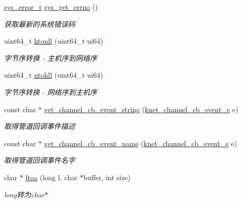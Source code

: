 \begin{DoxyCompactItemize}
\hyperlink{a00066_aeaea39e7ef5adeec1efaee3eee6b12ff_aeaea39e7ef5adeec1efaee3eee6b12ff}{sys\+\_\+error\+\_\+t} \hyperlink{a00099_a2e3ede072c59452900afcb1334611dac_a2e3ede072c59452900afcb1334611dac}{sys\+\_\+get\+\_\+errno} ()
\begin{DoxyCompactList}\small\item\em 获取最新的系统错误码 \end{DoxyCompactList}\item 
uint64\+\_\+t \hyperlink{a00099_ab1f59aa518d342661072356abbbb5e85_ab1f59aa518d342661072356abbbb5e85}{htonll} (uint64\+\_\+t ui64)
\begin{DoxyCompactList}\small\item\em 字节序转换 -\/ 主机序到网络序 \end{DoxyCompactList}\item 
uint64\+\_\+t \hyperlink{a00099_aebdeac120dd80e9450e54e6f18151f45_aebdeac120dd80e9450e54e6f18151f45}{ntohll} (uint64\+\_\+t ui64)
\begin{DoxyCompactList}\small\item\em 字节序转换 -\/ 网络序到主机序 \end{DoxyCompactList}\item 
const char $\ast$ \hyperlink{a00099_aaa5f51532b5e8589a2af4a949dfcb46b_aaa5f51532b5e8589a2af4a949dfcb46b}{get\+\_\+channel\+\_\+cb\+\_\+event\+\_\+string} (\hyperlink{a00066_a2fd2faf971268f5b682ab375c455f7c9_a2fd2faf971268f5b682ab375c455f7c9}{knet\+\_\+channel\+\_\+cb\+\_\+event\+\_\+e} e)
\begin{DoxyCompactList}\small\item\em 取得管道回调事件描述 \end{DoxyCompactList}\item 
const char $\ast$ \hyperlink{a00099_a3c666a6bdd27f2bdb2202ffd4fb8899e_a3c666a6bdd27f2bdb2202ffd4fb8899e}{get\+\_\+channel\+\_\+cb\+\_\+event\+\_\+name} (\hyperlink{a00066_a2fd2faf971268f5b682ab375c455f7c9_a2fd2faf971268f5b682ab375c455f7c9}{knet\+\_\+channel\+\_\+cb\+\_\+event\+\_\+e} e)
\begin{DoxyCompactList}\small\item\em 取得管道回调事件名字 \end{DoxyCompactList}\item 
char $\ast$ \hyperlink{a00099_aaf5ac9c0270bd67e64f697d7fcf5e9ea_aaf5ac9c0270bd67e64f697d7fcf5e9ea}{ltoa} (long l, char $\ast$buffer, int size)
\begin{DoxyCompactList}\small\item\em long转为char$\ast$ \end{DoxyCompactList}\item 

\end{DoxyCompactItemize}
